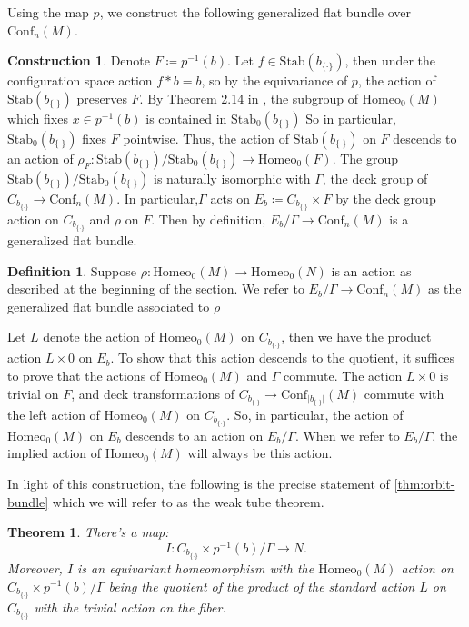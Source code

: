 \documentclass[10pt, oneside]{article}
\newcommand{\homeo}[1][S^1]{\text{Homeo}_0(#1)}
\newcommand{\conf}[2][S^1]{\text{Conf}_{#2}(#1)}
\newcommand{\set}{{\{\cdot\}}}
\newcommand{\stab}[1]{\text{Stab}(#1)}
\newcommand{\pstab}[1]{\text{Stab}_0(#1)}
\newcommand{\maxcov}{C_{b_\set}}
\newtheorem{thm}{Theorem}[section]
\theoremstyle{definition}
\newtheorem{defn}{Definition}[section]
\newtheorem*{construction*}{Construction}
\theoremstyle{definition}
\begin{document}
Using the map $p$, we construct the following generalized flat bundle over $\conf[M]{n}$.

\begin{construction*}\label{const:orbit-bundle}
    Denote $F\coloneqq p^{-1}(b)$.
    Let $f\in\stab{b_\set}$, then under the configuration space action $f*b=b$, so by the equivariance of $p$, the action of $\stab{b_\set}$ preserves $F$.
    By Theorem 2.14 in \cite{chen:StructureTheorems}, the subgroup of $\homeo[M]$ which fixes $x\in p^{-1}(b)$ is contained in $\pstab{b_\set}$
    So in particular, $\pstab{b_\set}$ fixes $F$ pointwise.
    Thus, the action of $\stab{b_\set}$ on $F$ descends to an action of $\rho_F:\stab{b_\set}/\pstab{b_\set}\to \homeo[F]$. The group $\stab{b_\set}/\pstab{b_\set}$ is naturally isomorphic with $\Gamma$, the deck group of $C_{b_\set}\to \conf[M]{n}$.
    In particular,$\Gamma$ acts on $E_b \coloneqq\maxcov\times F$ by the deck group action on $\maxcov$ and $\rho$ on $F$.
    Then by definition, $E_b/\Gamma\to\conf[M]{n}$ is a generalized flat bundle.

    \begin{defn}
        Suppose $\rho:\homeo[M]\to\homeo[N]$ is an action as described at the beginning of the section. We refer to $E_b/\Gamma\to\conf[M]{n}$ as the generalized flat bundle associated to $\rho$
    \end{defn}

    Let $L$ denote the action of $\homeo[M]$ on $\maxcov$, then we have the product action $L\times 0$ on $E_b$. To show that this action descends to the quotient, it suffices to prove that the actions of $\homeo[M]$ and $\Gamma$ commute. The action $L\times 0$ is trivial on $F$, and deck transformations of $\maxcov\to \conf[M]{\lvert b_{\set}\rvert}$ commute with the left action of $\homeo[M]$ on $\maxcov$. So, in particular, the action of $\homeo[M]$ on $E_b$ descends to an action on $E_b/\Gamma$. When we refer to $E_b/\Gamma$, the implied action of $\homeo[M]$ will always be this action.
\end{construction*}

In light of this construction, the following is the precise statement of \cref{thm:orbit-bundle} which we will refer to as the weak tube theorem.

\begin{thm}\label{thm:precise-orbit-bundle}
    There's a map: $$I: \maxcov \times p^{-1}(b)/ \Gamma \to N.$$
    Moreover, $I$ is an equivariant homeomorphism
    with the $\homeo[M]$ action on $\maxcov \times p^{-1}(b) / \Gamma$ being the quotient of the product of the standard action $L$ on $\maxcov$
    with the trivial action on the fiber.
\end{thm}
\end{document}
